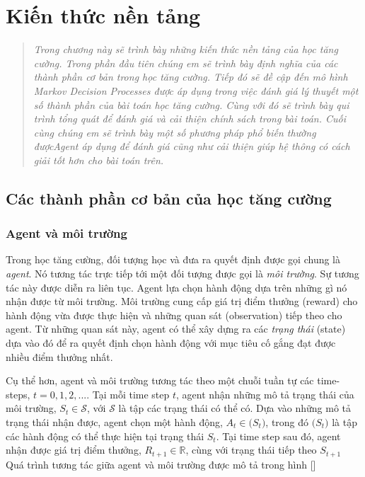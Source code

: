 \chapter{Kiến thức nền tảng}
\begin{quote}
\textit{Trong chương này sẽ trình bày những kiến thức nền tảng của học tăng cường. Trong phần đầu tiên chúng em sẽ trình bày định nghĩa của các thành phần cơ bản trong học tăng cường. Tiếp đó sẽ đề cập đến mô hình Markov Decision Processes được áp dụng trong việc đánh giá lý thuyết một số thành phần của bài toán học tăng cường. Cùng với đó sẽ trình bày qui trình tổng quát để đánh giá và cải thiện chính sách trong bài toán. Cuối cùng chúng em sẽ trình bày một số phương pháp phổ biến thường đượcAgent áp dụng để đánh giá cũng như cải thiện giúp hệ thông có cách giải tốt hơn cho bài toán trên.}
\end{quote}

\section{Các thành phần cơ bản của học tăng cường}
	\subsection{Agent và môi trường}
	Trong học tăng cường, đối tượng học và đưa ra quyết định được gọi chung là \textit{agent}. Nó tương tác trực tiếp tới một đối tượng được gọi là \textit{môi trường}. Sự tương tác này được diễn ra liên tục. Agent lựa chọn hành động dựa trên những gì nó nhận được từ môi trường. Môi trường cung cấp giá trị điểm thưởng (reward) cho hành động vừa được thực hiện và những quan sát (observation) tiếp theo cho agent. Từ những quan sát này, agent có thể xây dựng ra các \textit{trạng thái} (state) dựa vào đó để ra quyết định chọn hành động với mục tiêu cố gắng đạt được nhiều điểm thưởng nhất.
	
	Cụ thể hơn, agent và môi trường tương tác theo một chuỗi tuần tự các time-steps, $t = 0,1,2,...$. Tại mỗi time step $t$, agent nhận những mô tả trạng thái của môi trường, $\mathit{S_t} \in \mathcal{S}$, với $\mathcal{S}$ là tập các trạng thái có thể có. Dựa vào những mô tả trạng thái nhận được, agent chọn một hành động, $\mathit{A_t} \in \mathcal(\mathit{S_t})$, trong đó $\mathcal(\mathit{S_t})$ là tập các hành động có thể thực hiện tại trạng thái $\mathit{S_t}$. Tại time step sau đó, agent nhận được giá trị điểm thưởng, $\mathit{R_{t+1}} \in \mathbb{R}$, cùng với trạng thái tiếp theo $\mathit{S_{t+1}}$ Quá trình tương tác giữa agent và môi trường được mô tả trong hình []
	
